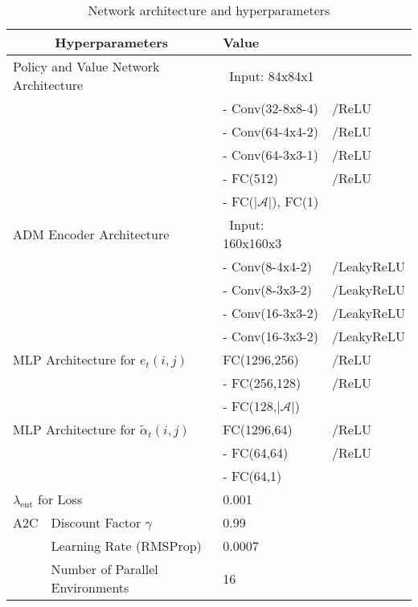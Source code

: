 \documentclass{article} \usepackage{iclr,times}
\begin{document}
{\begin{table}[H]
\small
\centering
\caption{Network architecture and hyperparameters}
    \vspace*{-5pt}
\smallskip
\label{tbl:hyper-archi}
\begin{tabular}{l l l l}
\toprule
\multicolumn{2}{c}{Hyperparameters} & Value \\
\midrule
\multicolumn{2}{l}{Policy and Value Network Architecture} &
~Input: 84x84x1 \\
                                      & & - Conv(32-8x8-4) & /ReLU\\
                                      & & - Conv(64-4x4-2) & /ReLU\\
                                      & & - Conv(64-3x3-1) & /ReLU \\
                                      & & - FC(512)        & /ReLU\\
                                      & & - FC($|\mathcal A|$), FC(1)\\
\midrule
\multicolumn{2}{l}{ADM Encoder Architecture} &
~Input: 160x160x3 \\
                         & & - Conv(8-4x4-2) & /LeakyReLU\\
                         & & - Conv(8-3x3-2) & /LeakyReLU\\
                         & & - Conv(16-3x3-2) & /LeakyReLU\\
                         & & - Conv(16-3x3-2) & /LeakyReLU\\
\multicolumn{2}{l}{ MLP Architecture for $e_t(i,j)$}
                         & FC(1296,256) &/ReLU \\
                                &&- FC(256,128)  &/ReLU \\
                                &&- FC(128,$|\mathcal A|$) \\
\multicolumn{2}{l}{MLP Architecture for $\widetilde{\alpha}_t(i,j)$}
                & FC(1296,64) &/ReLU \\
                                                 &&- FC(64,64) &/ReLU \\
                                                 &&- FC(64,1) \\
\multicolumn{2}{l}{$\lambda_\text{ent}$ for Loss}
                & 0.001 \\
\midrule
A2C & Discount Factor $\gamma$  & 0.99 \\
    & Learning Rate (RMSProp) & 0.0007 \\
    & Number of Parallel Environments & 16 \\

\end{tabular}
\end{table}}
\end{document}
